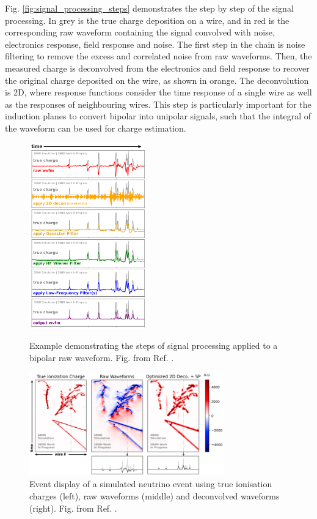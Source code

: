 Fig. \ref{fig:signal_processing_steps} \cite{LynnSignal} demonstrates the step by step of the signal processing.
In grey is the true charge deposition on a wire, and in red is the corresponding raw waveform containing the signal convolved with noise, electronics response, field response and noise.
The first step in the chain is noise filtering to remove the excess and correlated noise from raw waveforms.
Then, the measured charge is deconvolved from the electronics and field response to recover the original charge deposited on the wire, as shown in orange.
The deconvolution is 2D, where response functions consider the time response of a single wire as well as the responses of neighbouring wires.
This step is particularly important for the induction planes to convert bipolar into unipolar signals, such that the integral of the waveform can be used for charge estimation.
\begin{figure}[tbp!] 
\centering    
\includegraphics[width=0.45\textwidth]{signal_processing_steps}
\caption[signal_processing_steps]{
Example demonstrating the steps of signal processing applied to a bipolar raw waveform.
Fig. from Ref. \cite{LynnSignal}.
}
\label{fig:signal_processing_steps}
\vspace{1cm}
\centering    
\includegraphics[width=0.75\textwidth]{signal_processing_waveform}
\caption[signal_processing_waveform]{
Event display of a simulated neutrino event using true ionisation charges (left), raw waveforms (middle) and deconvolved waveforms (right).
Fig. from Ref. \cite{LynnSignal}.
}
\label{fig:signal_processing_waveform}
\end{figure}
